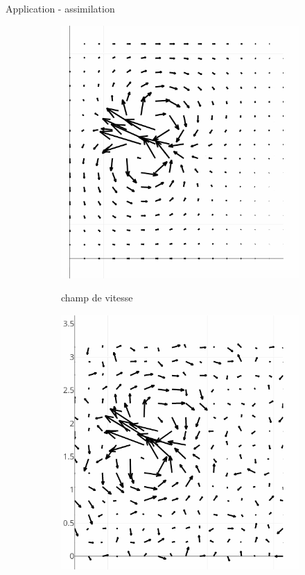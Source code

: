 \documentclass[aspectratio=169]{beamer} %
\begin{document}
\begin{frame}{Application - assimilation}
\begin{figure}[t]
\begin{subfigure}{0.3\textwidth}
            {\includegraphics[height=0.3\textheight]{../../conference/images/dipole_estimate/obs_no_noise/obs_no_noise-0.png}}
            \caption*{\tiny champ de vitesse}
        \end{subfigure}
        \begin{subfigure}{0.3\textwidth}
            \centering
            \alt<2>{%
                \animategraphics[loop, autoplay, height=0.3\textheight]{100}{../../conference/images/dipole_estimate/obs_noise/obs_noise-}{0}{1}%
            }
            {\includegraphics[height=0.3\textheight]{../../conference/images/dipole_estimate/obs_noise/obs_noise-0.png}}

\end{subfigure}
\end{figure}
\end{frame}
\end{document}
